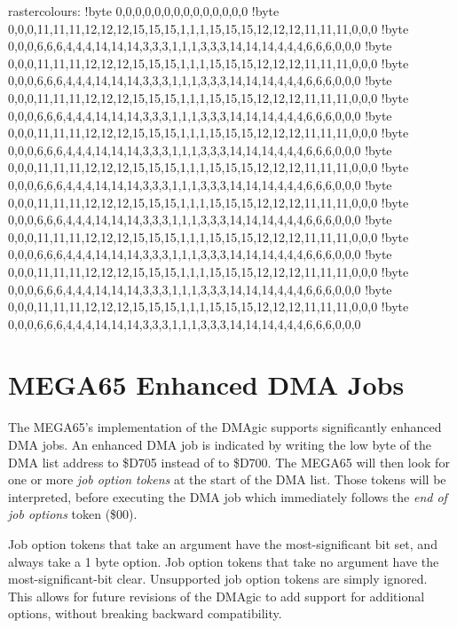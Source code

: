 \begin{screencode}
rastercolours:
	!byte 0,0,0,0,0,0,0,0,0,0,0,0,0,0
	!byte 0,0,0,11,11,11,12,12,12,15,15,15,1,1,1,15,15,15,12,12,12,11,11,11,0,0,0
	!byte 0,0,0,6,6,6,4,4,4,14,14,14,3,3,3,1,1,1,3,3,3,14,14,14,4,4,4,6,6,6,0,0,0
	!byte 0,0,0,11,11,11,12,12,12,15,15,15,1,1,1,15,15,15,12,12,12,11,11,11,0,0,0
	!byte 0,0,0,6,6,6,4,4,4,14,14,14,3,3,3,1,1,1,3,3,3,14,14,14,4,4,4,6,6,6,0,0,0
	!byte 0,0,0,11,11,11,12,12,12,15,15,15,1,1,1,15,15,15,12,12,12,11,11,11,0,0,0
	!byte 0,0,0,6,6,6,4,4,4,14,14,14,3,3,3,1,1,1,3,3,3,14,14,14,4,4,4,6,6,6,0,0,0
	!byte 0,0,0,11,11,11,12,12,12,15,15,15,1,1,1,15,15,15,12,12,12,11,11,11,0,0,0
	!byte 0,0,0,6,6,6,4,4,4,14,14,14,3,3,3,1,1,1,3,3,3,14,14,14,4,4,4,6,6,6,0,0,0
	!byte 0,0,0,11,11,11,12,12,12,15,15,15,1,1,1,15,15,15,12,12,12,11,11,11,0,0,0
	!byte 0,0,0,6,6,6,4,4,4,14,14,14,3,3,3,1,1,1,3,3,3,14,14,14,4,4,4,6,6,6,0,0,0
	!byte 0,0,0,11,11,11,12,12,12,15,15,15,1,1,1,15,15,15,12,12,12,11,11,11,0,0,0
	!byte 0,0,0,6,6,6,4,4,4,14,14,14,3,3,3,1,1,1,3,3,3,14,14,14,4,4,4,6,6,6,0,0,0
	!byte 0,0,0,11,11,11,12,12,12,15,15,15,1,1,1,15,15,15,12,12,12,11,11,11,0,0,0
	!byte 0,0,0,6,6,6,4,4,4,14,14,14,3,3,3,1,1,1,3,3,3,14,14,14,4,4,4,6,6,6,0,0,0
	!byte 0,0,0,11,11,11,12,12,12,15,15,15,1,1,1,15,15,15,12,12,12,11,11,11,0,0,0
	!byte 0,0,0,6,6,6,4,4,4,14,14,14,3,3,3,1,1,1,3,3,3,14,14,14,4,4,4,6,6,6,0,0,0
	!byte 0,0,0,11,11,11,12,12,12,15,15,15,1,1,1,15,15,15,12,12,12,11,11,11,0,0,0
	!byte 0,0,0,6,6,6,4,4,4,14,14,14,3,3,3,1,1,1,3,3,3,14,14,14,4,4,4,6,6,6,0,0,0
\end{screencode}

\section{MEGA65 Enhanced DMA Jobs}

The MEGA65's implementation of the DMAgic supports significantly
enhanced DMA jobs.  An enhanced DMA job is indicated by writing the
low byte of the DMA list address to \$D705 instead of to \$D700.  The
MEGA65 will then look for one or more {\em job option tokens} at the
start of the DMA list.  Those tokens will be interpreted, before
executing the DMA job which immediately follows the {\em end of job
  options} token (\$00).

Job option tokens that take an argument have the
most-significant bit set, and always take a 1 byte option.  Job option
tokens that take no argument have the most-significant-bit clear.
Unsupported job option tokens are simply ignored.
This allows for future revisions of the DMAgic to add support for
additional options, without breaking backward compatibility.


